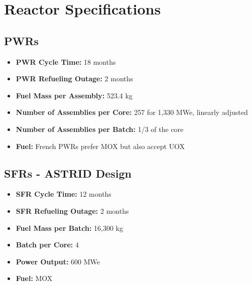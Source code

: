 \section{Reactor Specifications}

\subsection{\gls{PWR}s}
\begin{itemize}
	\item \textbf{PWR Cycle Time:} 18 months  
	\item \textbf{PWR Refueling Outage:} 2 months  
	\item \textbf{Fuel Mass per Assembly:} 523.4 kg  
	\item \textbf{Number of Assemblies per Core:} 257 for 1,330 MWe, linearly adjusted  
	\item \textbf{Number of Assemblies per Batch:} 1/3 of the core  
	\item \textbf{Fuel:} French \gls{PWR}s prefer \gls{MOX} but also accept \gls{UOX}
\end{itemize}

\subsection{\gls{SFR}s - ASTRID Design}
\begin{itemize}
	\item \textbf{SFR Cycle Time:} 12 months  
	\item \textbf{SFR Refueling Outage:} 2 months  
	\item \textbf{Fuel Mass per Batch:} 16,300 kg  
	\item \textbf{Batch per Core:} 4  
	\item \textbf{Power Output:} 600 MWe  
	\item \textbf{Fuel:} \gls{MOX}
\end{itemize}